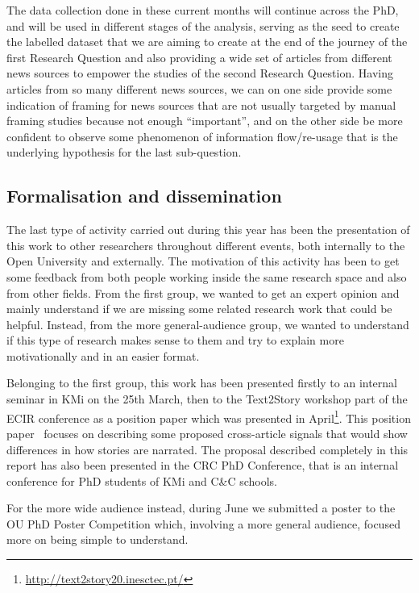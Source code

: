 
The data collection done in these current months will continue across the PhD, and will be used in different stages of the analysis, serving as the seed to create the labelled dataset that we are aiming to create at the end of the journey of the first Research Question and also providing a wide set of articles from different news sources to empower the studies of the second Research Question.
Having articles from so many different news sources, we can on one side provide some indication of framing for news sources that are not usually targeted by manual framing studies because not enough ``important'', and on the other side be more confident to observe some phenomenon of information flow/re-usage that is the underlying hypothesis for the last sub-question.

\subsection{Formalisation and dissemination}
The last type of activity carried out during this year has been the presentation of this work to other researchers throughout different events, both internally to the Open University and externally.
The motivation of this activity has been to get some feedback from both people working inside the same research space and also from other fields.
From the first group, we wanted to get an expert opinion and mainly understand if we are missing some related research work that could be helpful.
Instead, from the more general-audience group, we wanted to understand if this type of research makes sense to them and try to explain more motivationally and in an easier format.

Belonging to the first group, this work has been presented firstly to an internal seminar in KMi on the 25th March, then to the Text2Story workshop part of the ECIR conference as a position paper which was presented in April\footnote{\url{http://text2story20.inesctec.pt/}}.
This position paper~\cite{mensio2020towards} focuses on describing some proposed cross-article signals that would show differences in how stories are narrated.
The proposal described completely in this report has also been presented in the CRC PhD Conference, that is an internal conference for PhD students of KMi and C\&C schools.

For the more wide audience instead, during June we submitted a poster to the OU PhD Poster Competition which, involving a more general audience, focused more on being simple to understand.

